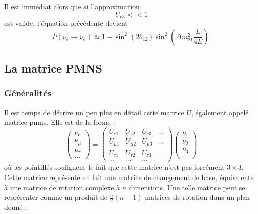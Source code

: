             Il est immédiat alors que si l'approximation 
            \begin{equation}\label{eq::approx_13_eq_0}
                U_{e3} << 1
            \end{equation}
            est valide, l'équation précédente devient
            \begin{equation}\label{eq::solar_oscillation}
                P(\nu_e\to\nu_e) \simeq 1-\sin^2(2\theta_{12})\sin^2\left(\Delta m^2_{21}\frac{L}{4E}\right).
            \end{equation}
            
        \subsection{La matrice PMNS}\label{sec::pmns}
            \subsubsection{Généralités}
            Il est temps de décrire un peu plus en détail cette matrice $U$, également appelé matrice \gls{pmns}. Elle est de la forme : 
            \begin{equation}
                \left(\begin{matrix}
                     \nu_e \\ \nu_{\mu} \\ \nu_{\tau} \\ ...
                \end{matrix}\right) =
                \left(\begin{matrix}
                    U_{e1} & U_{e2} & U_{e3} & ... \\
                    U_{\mu 1} & U_{\mu 2} & U_{\mu 3} & ... \\
                    U_{\tau 1} & U_{\tau 2} & U_{\tau 3} & ... \\
                    ... & ... & ... &
                \end{matrix}\right)
                \left(\begin{matrix}
                     \nu_1 \\ \nu_2 \\ \nu_3 \\ ...
                \end{matrix}\right)
            \end{equation}
            où les pointillés soulignent le fait que cette matrice n'est pas forcément $3\times 3$. Cette matrice représente en fait une matrice de changement de base, équivalente à une matrice de rotation complexe à $n$ dimensions. Une telle matrice peut se représenter comme un produit de $\frac{n}{2}(n-1)$ matrices de rotation dans un plan donné\cite{Valle2006,Harari1986} : 
